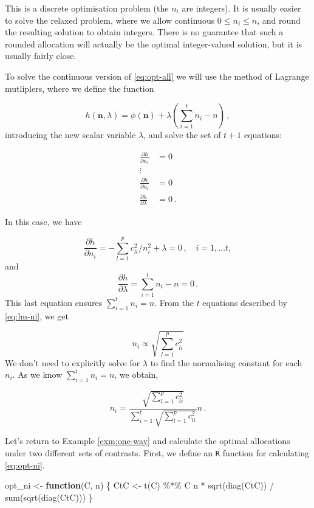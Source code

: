 \documentclass[
]{book}
\newenvironment{Shaded}{\begin{snugshade}}{\end{snugshade}}
\newcommand{\ControlFlowTok}[1]{\textcolor[rgb]{0.13,0.29,0.53}{\textbf{#1}}}
\newcommand{\FunctionTok}[1]{\textcolor[rgb]{0.00,0.00,0.00}{#1}}
\newcommand{\NormalTok}[1]{#1}
\newcommand{\OtherTok}[1]{\textcolor[rgb]{0.56,0.35,0.01}{#1}}
\newcommand{\SpecialCharTok}[1]{\textcolor[rgb]{0.00,0.00,0.00}{#1}}
\theoremstyle{definition}
\theoremstyle{definition}
\theoremstyle{definition}
\theoremstyle{definition}
\theoremstyle{remark}
\begin{document}
This is a discrete optimisation problem (the \(n_i\) are integers). It is usually easier to solve the relaxed problem, where we allow continuous \(0\le n_i \le n\), and round the resulting solution to obtain integers. There is no guarantee that such a rounded allocation will actually be the optimal integer-valued solution, but it is usually fairly close.

To solve the continuous version of \eqref{eq:opt-all} we will use the method of Lagrange mutliplers, where we define the function

\[
h(\boldsymbol{n}, \lambda) = \phi(\boldsymbol{n}) + \lambda\left(\sum_{i=1}^tn_i - n\right)\,,
\]
introducing the new scalar variable \(\lambda\), and solve the set of \(t+1\) equations:

\begin{align*}
\frac{\partial h}{\partial n_1} & = 0 \\
\vdots & \\
\frac{\partial h}{\partial n_t} & = 0 \\
\frac{\partial h}{\partial \lambda} & = 0\,.
\end{align*}

In this case, we have

\begin{equation}
\frac{\partial h}{\partial n_i} = -\sum_{l=1}^pc_{li}^2/n_i^2 + \lambda = 0\,,\quad i=1,\ldots t,
\label{eq:lm-ni}
\end{equation}
and
\[
\frac{\partial h}{\partial \lambda} = \sum_{i=1}^t n_i - n = 0\,.
\]
This last equation ensures \(\sum_{i=1}^tn_i = n\). From the \(t\) equations described by \eqref{eq:lm-ni}, we get

\[
n_i \propto \sqrt{\sum_{l=1}^pc_{li}^2}
\]
We don't need to explicitly solve for \(\lambda\) to find the normalising constant for each \(n_i\). As we know \(\sum_{i=1}^tn_i = n\), we obtain,

\begin{equation}
n_i = \frac{\sqrt{\sum_{l=1}^pc_{li}^2}}{\sum_{i=1}^t\sqrt{\sum_{l=1}^pc_{li}^2}}n\,.
\label{eq:opt-ni}
\end{equation}

Let's return to Example \ref{exm:one-way} and calculate the optimal allocations under two different sets of contrasts. First, we define an \texttt{R} function for calculating \eqref{eq:opt-ni}.

\begin{Shaded}
\begin{Highlighting}[]
\NormalTok{opt\_ni }\OtherTok{\textless{}{-}} \ControlFlowTok{function}\NormalTok{(C, n) \{}
\NormalTok{  CtC }\OtherTok{\textless{}{-}} \FunctionTok{t}\NormalTok{(C) }\SpecialCharTok{\%*\%}\NormalTok{ C}
\NormalTok{  n }\SpecialCharTok{*} \FunctionTok{sqrt}\NormalTok{(}\FunctionTok{diag}\NormalTok{(CtC)) }\SpecialCharTok{/} \FunctionTok{sum}\NormalTok{(}\FunctionTok{sqrt}\NormalTok{(}\FunctionTok{diag}\NormalTok{(CtC)))}
\NormalTok{\} }
\end{Highlighting}
\end{Shaded}
\end{document}
